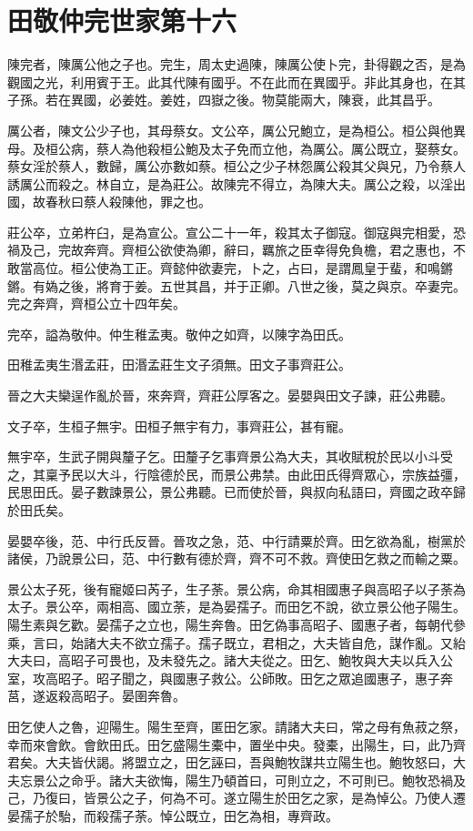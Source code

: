 \chapter{田敬仲完世家第十六}

陳完者，陳厲公他之子也。完生，周太史過陳，陳厲公使卜完，卦得觀之否，是為觀國之光，利用賓于王。此其代陳有國乎。不在此而在異國乎。非此其身也，在其子孫。若在異國，必姜姓。姜姓，四嶽之後。物莫能兩大，陳衰，此其昌乎。

厲公者，陳文公少子也，其母蔡女。文公卒，厲公兄鮑立，是為桓公。桓公與他異母。及桓公病，蔡人為他殺桓公鮑及太子免而立他，為厲公。厲公既立，娶蔡女。蔡女淫於蔡人，數歸，厲公亦數如蔡。桓公之少子林怨厲公殺其父與兄，乃令蔡人誘厲公而殺之。林自立，是為莊公。故陳完不得立，為陳大夫。厲公之殺，以淫出國，故春秋曰蔡人殺陳他，罪之也。

莊公卒，立弟杵臼，是為宣公。宣公二十一年，殺其太子御寇。御寇與完相愛，恐禍及己，完故奔齊。齊桓公欲使為卿，辭曰，羈旅之臣幸得免負檐，君之惠也，不敢當高位。桓公使為工正。齊懿仲欲妻完，卜之，占曰，是謂鳳皇于蜚，和鳴鏘鏘。有媯之後，將育于姜。五世其昌，并于正卿。八世之後，莫之與京。卒妻完。完之奔齊，齊桓公立十四年矣。

完卒，謚為敬仲。仲生稚孟夷。敬仲之如齊，以陳字為田氏。

田稚孟夷生湣孟莊，田湣孟莊生文子須無。田文子事齊莊公。

晉之大夫欒逞作亂於晉，來奔齊，齊莊公厚客之。晏嬰與田文子諫，莊公弗聽。

文子卒，生桓子無宇。田桓子無宇有力，事齊莊公，甚有寵。

無宇卒，生武子開與釐子乞。田釐子乞事齊景公為大夫，其收賦稅於民以小斗受之，其稟予民以大斗，行陰德於民，而景公弗禁。由此田氏得齊眾心，宗族益彊，民思田氏。晏子數諫景公，景公弗聽。已而使於晉，與叔向私語曰，齊國之政卒歸於田氏矣。

晏嬰卒後，范、中行氏反晉。晉攻之急，范、中行請粟於齊。田乞欲為亂，樹黨於諸侯，乃說景公曰，范、中行數有德於齊，齊不可不救。齊使田乞救之而輸之粟。

景公太子死，後有寵姬曰芮子，生子荼。景公病，命其相國惠子與高昭子以子荼為太子。景公卒，兩相高、國立荼，是為晏孺子。而田乞不說，欲立景公他子陽生。陽生素與乞歡。晏孺子之立也，陽生奔魯。田乞偽事高昭子、國惠子者，每朝代參乘，言曰，始諸大夫不欲立孺子。孺子既立，君相之，大夫皆自危，謀作亂。又紿大夫曰，高昭子可畏也，及未發先之。諸大夫從之。田乞、鮑牧與大夫以兵入公室，攻高昭子。昭子聞之，與國惠子救公。公師敗。田乞之眾追國惠子，惠子奔莒，遂返殺高昭子。晏圉奔魯。

田乞使人之魯，迎陽生。陽生至齊，匿田乞家。請諸大夫曰，常之母有魚菽之祭，幸而來會飲。會飲田氏。田乞盛陽生橐中，置坐中央。發橐，出陽生，曰，此乃齊君矣。大夫皆伏謁。將盟立之，田乞誣曰，吾與鮑牧謀共立陽生也。鮑牧怒曰，大夫忘景公之命乎。諸大夫欲悔，陽生乃頓首曰，可則立之，不可則已。鮑牧恐禍及己，乃復曰，皆景公之子，何為不可。遂立陽生於田乞之家，是為悼公。乃使人遷晏孺子於駘，而殺孺子荼。悼公既立，田乞為相，專齊政。

